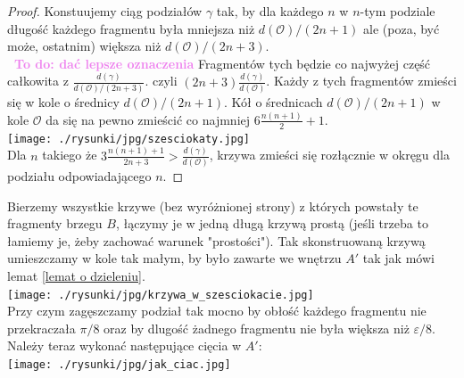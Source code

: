 \documentclass[a4paper, 12pt]{article}
\newtheorem{lemma}[observation]{Lemma}
\newcommand{\smalltodoII}[1]{\hfill \break \textbf{\ \textcolor{violet}{To do: #1}}\hfill \break}
\newcommand{\rysunek}[1]{\hfill \break\\[16pt] \Huge \textbf{\textcolor{violet}{Brakujący rysunek \normalsize
#1}} \hfill
\break \\[16pt] \normalsize}
\begin{document}
\begin{proof}
    Konstuujemy ciąg podziałów $\gamma$
     tak, by dla każdego $n$ w $n$-tym podziale
     długość każdego fragmentu była mniejsza niż $d(\mathcal{O})/(2n+1)$ ale (poza, być może, ostatnim)
      większa niż $d(\mathcal{O})/(2n+3)$. \\
      \smalltodoII{dać lepsze oznaczenia}
     Fragmentów tych będzie co najwyżej część całkowita z $\frac{d(\gamma)}{d(\mathcal{O})/(2n+3)}$.
     czyli $(2n+3)\frac{d(\gamma)}{d(\mathcal{O})}$. Każdy z tych fragmentów zmieści się w kole
     o średnicy $d(\mathcal{O})/(2n+1)$. Kół o średnicach $d(\mathcal{O})/(2n+1)$ w kole $\mathcal{O}$ da się
      na pewno zmieścić co najmniej $6\frac{n(n+1)}{2}+1$. \\
      \texttt{[image: ./rysunki/jpg/szesciokaty.jpg]} \\
      Dla $n$ takiego że $3\frac{n(n+1)+1}{2n+3}>\frac{d(\gamma)}{d(\mathcal{O})}$, krzywa zmieści się
      rozłącznie w okręgu dla podziału odpowiadającego $n$.
\end{proof}

Bierzemy wszystkie krzywe (bez wyróżnionej strony) z których powstały te fragmenty brzegu $B$, łączymy je
w jedną długą krzywą prostą (jeśli trzeba to łamiemy je, żeby zachować warunek "prostości").
Tak skonstruowaną krzywą umieszczamy w kole tak małym, by było zawarte we wnętrzu $A'$ tak jak mówi lemat
\ref{lemat o dzieleniu}. \\
\texttt{[image: ./rysunki/jpg/krzywa\_w\_szesciokacie.jpg]} \\
Przy czym zagęszczamy podział tak mocno by obłość każdego fragmentu nie
przekraczała $\pi/8$ oraz by dlugość żadnego fragmentu nie była większa niż $\varepsilon/8$. \\
Należy teraz wykonać następujące cięcia w $A'$: \\
\texttt{[image: ./rysunki/jpg/jak\_ciac.jpg]} \\
\end{document}
